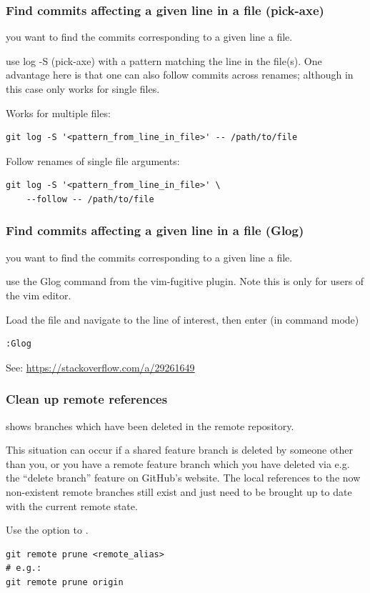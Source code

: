 \documentclass{git_course}
\begin{document}
\begin{frame}[fragile]
    \frametitle{Find commits affecting a given line in a file (pick-axe)}

     you want to find the commits corresponding to a given
    line a file.

     use log -S (pick-axe) with a pattern matching the line
    in the file(s).  One advantage here is that one can also follow commits
    across renames; although in this case only works for single files.

Works for multiple files:
\begin{lstlisting}
git log -S '<pattern_from_line_in_file>' -- /path/to/file
\end{lstlisting}

Follow renames of single file arguments:
\begin{lstlisting}
git log -S '<pattern_from_line_in_file>' \
    --follow -- /path/to/file
\end{lstlisting}

\end{frame}


\begin{frame}[fragile]
    \frametitle{Find commits affecting a given line in a file (Glog)}

     you want to find the commits corresponding to a given
    line a file.

     use the Glog command from the vim-fugitive plugin.  Note
    this is only for users of the vim editor.

    Load the file and navigate to the line of interest, then enter (in
    command mode)
\begin{lstlisting}
:Glog
\end{lstlisting}

    See: \url{https://stackoverflow.com/a/29261649}
\end{frame}

\begin{frame}[fragile]
    \frametitle{Clean up remote references}

      shows branches which have been
    deleted in the remote repository.

    This situation can occur if a shared feature branch is deleted by
    someone other than you, or you have a remote feature branch which you
    have deleted via e.g. the ``delete branch'' feature on GitHub's website.
    The local references to the now non-existent remote branches still exist
    and just need to be brought up to date with the current remote state.

     Use the  option to .

\begin{lstlisting}
git remote prune <remote_alias>
# e.g.:
git remote prune origin
\end{lstlisting}
\end{frame}
\end{document}
